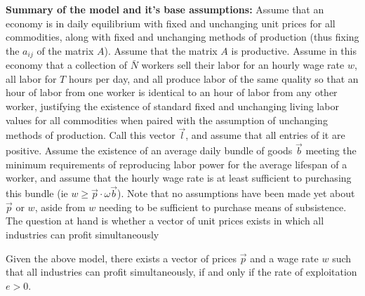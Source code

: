 \textbf{Summary of the model and it's base assumptions:} 
 Assume that an economy is in daily equilibrium with fixed and unchanging unit prices for all commodities, along with fixed and unchanging methods of production (thus fixing the $a_{ij}$ of the matrix $A$). Assume that the matrix $A$ is productive. Assume in this economy that a collection of $\bar{N}$ workers sell their labor for an hourly wage rate $w$, all labor for $T$ hours per day, and all produce labor of the same quality so that an hour of labor from one worker is identical to an hour of labor from any other worker, justifying the existence of standard fixed and unchanging living labor values for all commodities when paired with the assumption of unchanging methods of production. Call this vector $\vec{l}$, and assume that all entries of it are positive. Assume the existence of an average daily bundle of goods $\vec{b}$ meeting the minimum requirements of reproducing labor power for the average lifespan of a worker, and assume that the hourly wage rate is at least sufficient to purchasing this bundle (ie $w \geq \vec{p} \cdot \omega\vec{b}$). Note that no assumptions have been made yet about $\vec{p}$ or $w$, aside from $w$ needing to be sufficient to purchase means of subsistence. The question at hand is whether a vector of unit prices exists in which all industries can profit simultaneously 
\begin{theorem}
	Given the above model, there exists a vector of prices $\vec{p}$ and a wage rate $w$ such that all industries can profit simultaneously, if and only if the rate of exploitation $e > 0$.
\end{theorem}
